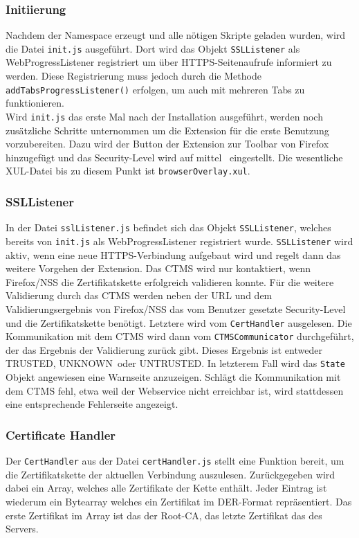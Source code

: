 \documentclass[accentcolor=tud1c,article,colorback,11pt]{tudreport}
\begin{document}
\subsubsection{Initiierung}
Nachdem der Namespace erzeugt und alle nötigen Skripte geladen wurden, wird die Datei \texttt{init.js} ausgeführt. Dort wird das Objekt \texttt{SSLListener} als WebProgressListener registriert um über HTTPS-Seitenaufrufe informiert zu werden. Diese Registrierung muss jedoch durch die Methode \texttt{addTabsProgressListener()} \cite{allTabs} erfolgen, um auch mit mehreren Tabs zu funktionieren.\\
Wird \texttt{init.js} das erste Mal nach der Installation ausgeführt, werden noch zusätzliche Schritte unternommen um die Extension für die erste Benutzung vorzubereiten. Dazu wird der Button der Extension zur Toolbar von Firefox hinzugefügt und das Security-Level wird auf \glqq mittel\grqq~ eingestellt. Die wesentliche XUL-Datei bis zu diesem Punkt ist \texttt{browserOverlay.xul}.

\subsubsection{SSLListener}
In der Datei \texttt{sslListener.js} befindet sich das Objekt \texttt{SSLListener}, welches bereits von \texttt{init.js} als WebProgressListener \cite{progressListener} registriert wurde. \texttt{SSLListener} wird aktiv, wenn eine neue HTTPS-Verbindung aufgebaut wird und regelt dann das weitere Vorgehen der Extension. Das CTMS wird nur kontaktiert, wenn Firefox/NSS die Zertifikatskette erfolgreich validieren konnte. Für die weitere Validierung durch das CTMS werden neben der URL und dem Validierungsergebnis von Firefox/NSS das vom Benutzer gesetzte Security-Level und die Zertifikatskette benötigt. Letztere wird vom \texttt{CertHandler} ausgelesen. Die Kommunikation mit dem CTMS wird dann vom \texttt{CTMSCommunicator} durchgeführt, der das Ergebnis der Validierung zurück gibt. Dieses Ergebnis ist entweder \glqq TRUSTED\grqq, \glqq UNKNOWN\grqq~oder \glqq UNTRUSTED\grqq. In letzterem Fall wird das \texttt{State} Objekt angewiesen eine Warnseite anzuzeigen. Schlägt die Kommunikation mit dem CTMS fehl, etwa weil der Webservice nicht erreichbar ist, wird stattdessen eine entsprechende Fehlerseite angezeigt.

\subsubsection{Certificate Handler}
Der \texttt{CertHandler} aus der Datei \texttt{certHandler.js} stellt eine Funktion bereit, um die Zertifikatskette der aktuellen Verbindung auszulesen. Zurückgegeben wird dabei ein Array, welches alle Zertifikate der Kette enthält. Jeder Eintrag ist wiederum ein Bytearray welches ein Zertifikat im DER-Format \cite{DER} repräsentiert. Das erste Zertifikat im Array ist das der Root-CA, das letzte Zertifikat das des Servers.
\end{document}
